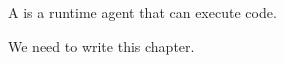
A  is a runtime agent that can execute code.

\begin{Incomplete}
We need to write this chapter.
\end{Incomplete}